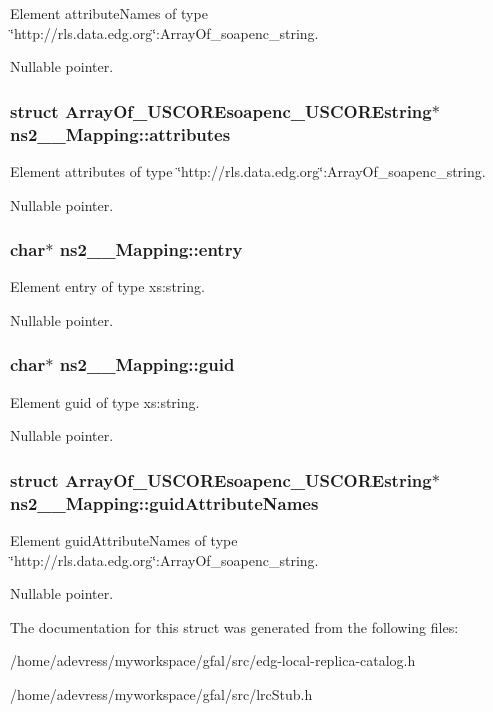 Element attribute\-Names of type \char`\"{}http://rls.data.edg.org\char`\"{}:Array\-Of\_\-soapenc\_\-string. 

Nullable pointer. 
\subsubsection{\setlength{\rightskip}{0pt plus 5cm}struct \bf{Array\-Of\_\-USCOREsoapenc\_\-USCOREstring}$\ast$ \bf{ns2\_\-\_\-Mapping::attributes}}\label{structns2____Mapping_239e76c8fa630493230f81cb26c42368}


Element attributes of type \char`\"{}http://rls.data.edg.org\char`\"{}:Array\-Of\_\-soapenc\_\-string. 

Nullable pointer. 
\subsubsection{\setlength{\rightskip}{0pt plus 5cm}char$\ast$ \bf{ns2\_\-\_\-Mapping::entry}}\label{structns2____Mapping_37164b7a9f5b4828b78b3edc2d1db656}


Element entry of type xs:string. 

Nullable pointer. 
\subsubsection{\setlength{\rightskip}{0pt plus 5cm}char$\ast$ \bf{ns2\_\-\_\-Mapping::guid}}\label{structns2____Mapping_b23babab55f61e9f3dd9154a1ce88e49}


Element guid of type xs:string. 

Nullable pointer. 
\subsubsection{\setlength{\rightskip}{0pt plus 5cm}struct \bf{Array\-Of\_\-USCOREsoapenc\_\-USCOREstring}$\ast$ \bf{ns2\_\-\_\-Mapping::guid\-Attribute\-Names}}\label{structns2____Mapping_c53c70829394dd85f68cff7c4f111b42}


Element guid\-Attribute\-Names of type \char`\"{}http://rls.data.edg.org\char`\"{}:Array\-Of\_\-soapenc\_\-string. 

Nullable pointer. 

The documentation for this struct was generated from the following files:\begin{CompactItemize}
\item 
/home/adevress/myworkspace/gfal/src/edg-local-replica-catalog.h\item 
/home/adevress/myworkspace/gfal/src/lrc\-Stub.h\end{CompactItemize}
